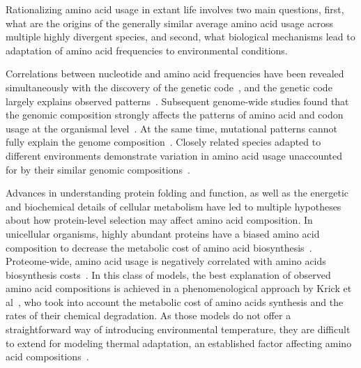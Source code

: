 \documentclass[10pt,letterpaper]{article}
\begin{document}
Rationalizing amino acid usage in extant life involves two main questions, first, what are the origins of the generally similar average amino acid usage across multiple highly divergent species, and second, what biological mechanisms lead to adaptation of amino acid frequencies to environmental conditions. 

Correlations between nucleotide and amino acid frequencies have been revealed simultaneously with the discovery of the genetic code~\cite{Sueoka1961Correlation}, and the genetic code largely explains observed patterns~\cite{Jukes1975Amino,King1969NonDarwinian}. Subsequent genome-wide studies found that the genomic composition strongly affects the patterns of amino acid and codon usage at the organismal level~\cite{Kreil2001Identification,Knight2001Simple,Lightfield2011Across,Goncearenco2014Fundamental}. At the same time, mutational patterns cannot fully explain the genome composition~\cite{Rocha2010Mutational}. Closely related species adapted to different environments demonstrate variation in amino acid usage unaccounted for by their similar genomic compositions~\cite{Singer2003Thermophilic,Mcdonald2010Temperature,Haney1999Thermal,Fukuchi2003Unique}. 

Advances in understanding protein folding and function, as well as the energetic and biochemical details of cellular metabolism have led to multiple hypotheses about how protein-level selection may affect amino acid composition. In unicellular organisms, highly abundant proteins have a biased amino acid composition to decrease the metabolic cost of amino acid biosynthesis~\cite{Akashi2002Metabolic,Heizer2006Amino}.  Proteome-wide, amino acid usage is negatively correlated with amino acids biosynthesis costs~\cite{Seligmann2003CostMinimization,Heizer2011Amino}. In this class of models, the best explanation of observed amino acid compositions is achieved in a phenomenological approach by Krick et al~\cite{Krick2014Amino}, who took into account the metabolic cost of amino acids synthesis and the rates of their chemical degradation.  As those models do not offer a straightforward way of introducing environmental temperature, they are difficult to extend for modeling thermal adaptation, an established factor affecting amino acid compositions~\cite{Zeldovich2007Protein,Singer2003Thermophilic,Kreil2001Identification,Haney1999Thermal}.
\end{document}
